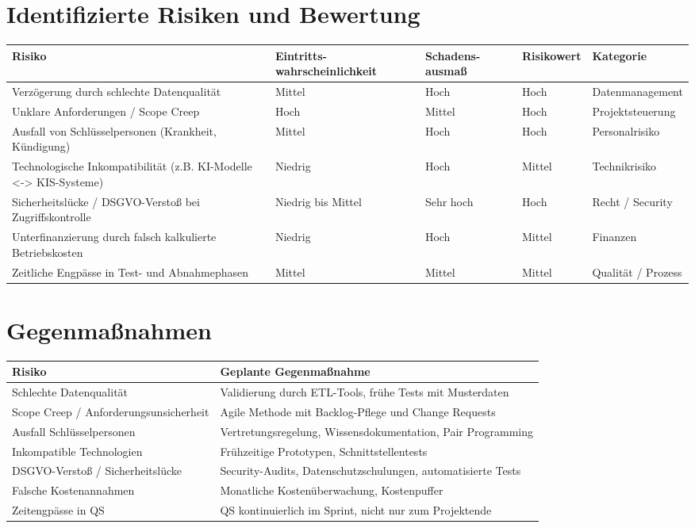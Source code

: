 \section{Identifizierte Risiken und Bewertung}
\begin{center}
	\begin{tabular}{|p{4.5cm}|p{2.5cm}|p{2.5cm}|p{2.5cm}|p{3cm}|}
		\hline
		\textbf{Risiko} & \textbf{Eintritts- wahrscheinlichkeit} & \textbf{Schadens- ausmaß} & \textbf{Risikowert} & \textbf{Kategorie} \\
		\hline
		Verzögerung durch schlechte Datenqualität & Mittel & Hoch & Hoch & Datenmanagement \\
		\hline
		Unklare Anforderungen / Scope Creep & Hoch & Mittel & Hoch & Projektsteuerung \\
		\hline
		Ausfall von Schlüsselpersonen (Krankheit, Kündigung) & Mittel & Hoch & Hoch & Personalrisiko \\
		\hline
		Technologische Inkompatibilität (z.B. KI-Modelle <-> KIS-Systeme) & Niedrig & Hoch & Mittel & Technikrisiko \\
		\hline
		Sicherheitslücke / DSGVO-Verstoß bei Zugriffskontrolle & Niedrig bis Mittel & Sehr hoch & Hoch & Recht / Security \\
		\hline
		Unterfinanzierung durch falsch kalkulierte Betriebskosten & Niedrig & Hoch & Mittel & Finanzen \\
		\hline
		Zeitliche Engpässe in Test- und Abnahmephasen & Mittel & Mittel & Mittel & Qualität / Prozess \\
		\hline
	\end{tabular}
\end{center}
\section{Gegenmaßnahmen}
\begin{center}
	\begin{tabular}{|p{7cm}|p{9cm}|}
		\hline
		\textbf{Risiko} & \textbf{Geplante Gegenmaßnahme} \\
		\hline
		Schlechte Datenqualität & Validierung durch ETL-Tools, frühe Tests mit Musterdaten \\
		\hline
		Scope Creep / Anforderungsunsicherheit & Agile Methode mit Backlog-Pflege und Change Requests \\
		\hline
		Ausfall Schlüsselpersonen & Vertretungsregelung, Wissensdokumentation, Pair Programming \\
		\hline
		Inkompatible Technologien & Frühzeitige Prototypen, Schnittstellentests \\
		\hline
		DSGVO-Verstoß / Sicherheitslücke & Security-Audits, Datenschutzschulungen, automatisierte Tests \\
		\hline
		Falsche Kostenannahmen & Monatliche Kostenüberwachung, Kostenpuffer \\
		\hline
		Zeitengpässe in QS & QS kontinuierlich im Sprint, nicht nur zum Projektende \\
		\hline
	\end{tabular}
\end{center}

\newpage
\newpage
